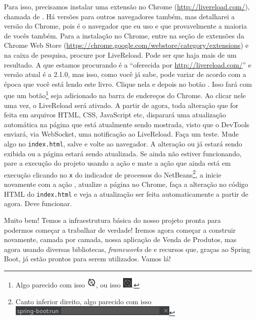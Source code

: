 Para isso, precisamos instalar uma extensão no Chrome (\url{http://livereload.com/}), chamada de . Há versões para outros navegadores também, mas detalharei a versão do Chrome, pois é o navegador que eu uso e que provavelmente a maioria de vocês também. Para a instalação no Chrome, entre na seção de extensões da Chrome Web Store (\url{https://chrome.google.com/webstore/category/extensions}) e na caixa de pesquisa, procure por LiveReload. Pode ser que haja mais de um resultado. A que estamos procurando é a ``oferecida por \url{http://livereload.com/}'' e versão atual é a 2.1.0, mas isso, como você já sabe, pode variar de acordo com a época que você está lendo este livro. Clique nela e depois no botão . Isso fará com que um botão\footnote{Algo parecido com isso \includegraphics[scale=1]{imagens/cap10BotaoLiveReloadBranco}, ou isso \includegraphics[scale=1]{imagens/cap10BotaoLiveReloadPreto}.} seja adicionado na barra de endereços do Chrome. Ao clicar nele uma vez, o LiveReload será ativado. A partir de agora, toda alteração que for feita em arquivos HTML, CSS, JavaScript etc, disparará uma atualização automática na página que está atualmente sendo mostrada, visto que o DevTools enviará, via WebSocket, uma notificação ao LiveReload. Faça um teste. Mude algo no \texttt{index.html}, salve e volte ao navegador. A alteração ou já estará sendo exibida ou a página estará sendo atualizada. Se ainda não estiver funcionando, pare a execução do projeto usando a ação  e mate a ação  que ainda está em execução clicando no \texttt{x} do indicador de processos do NetBeans\footnote{Canto inferior direito, algo parecido com isso \includegraphics[scale=1]{imagens/cap10MatarProcessoSpringBootRun}}, a inicie novamente com a ação , atualize a página no Chrome, faça a alteração no código HTML do \texttt{index.html} e veja a atualização ser feita automaticamente a partir de agora. Deve funcionar.

Muito bem! Temos a infraestrutura básica do nosso projeto pronta para podermos começar a trabalhar de verdade! Iremos agora começar a construir novamente, camada por camada, nossa aplicação de Venda de Produtos, mas agora usando diversas bibliotecas, \textit{frameworks} de e recursos que, graças ao Spring Boot, já estão prontos para serem utilizados. Vamos lá!


